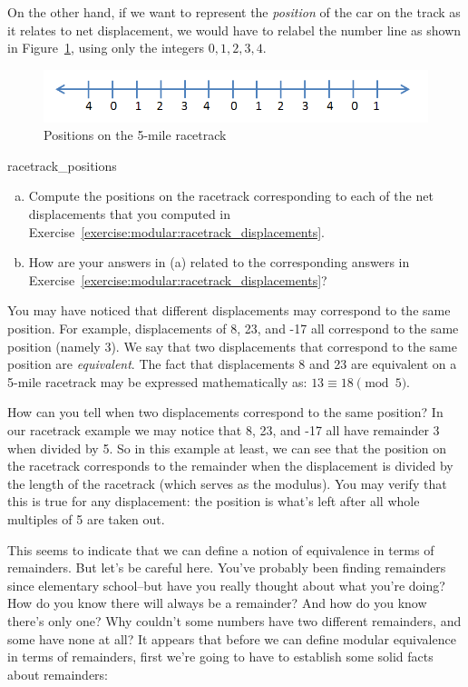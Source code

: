 On the other hand, if we want to represent the \emph{position} of the car on the track as it relates to net displacement, we would have to relabel the number line as shown in  Figure~\ref{fig:positions}, using only the integers $0,1,2,3,4$.   
\begin{figure}[h]
\begin{center}
\includegraphics[width=4.5in]{images/integers_mod_5.png}
\end{center}
\caption{\label{fig:positions}Positions on the 5-mile racetrack}
\end{figure}

\begin{exercise}{racetrack_positions}
\begin{enumerate}[(a)]
\item
Compute the positions on the racetrack corresponding to each of the net displacements that you computed in Exercise~\ref{exercise:modular:racetrack_displacements}.
\item
How are your answers in (a) related to the corresponding answers in Exercise~\ref{exercise:modular:racetrack_displacements}?
\end{enumerate}
\end{exercise}

You may have noticed that different displacements may correspond to the same position. For example, displacements of 8, 23, and -17 all correspond to the same position (namely 3). We say that two displacements that correspond to the same position are \emph{equivalent}. The fact that displacements 8 and 23 are equivalent on a 5-mile racetrack may be expressed mathematically as: $13 \equiv 18 \pmod{5}$.

How can you tell when two displacements correspond to the same position?  
In our racetrack example we may notice that 8, 23, and -17 all  have remainder 3 when divided by 5. 
So in this example at least, we can see that the position  on the racetrack corresponds to the remainder when the displacement is divided by the length of the racetrack (which serves as the modulus).
You may verify that this is true for any displacement: the position is what's left after all whole multiples of 5 are taken out.

This seems to indicate that we can define a notion of equivalence in terms of remainders. But let's be careful here. You've probably been finding remainders since elementary school--but have you really thought about what you're doing?
How do you know there will always be a remainder? And how do you know there's only one?  Why couldn't some numbers have two different remainders, and some have none at all? It appears that before we can define modular equivalence in terms of remainders, 
first we're going to have to establish some solid facts about remainders:

